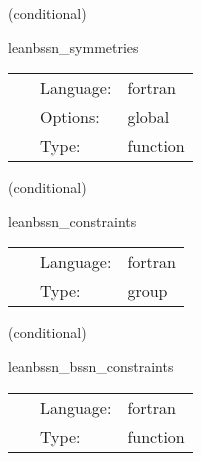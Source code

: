 \vspace{5mm}

   (conditional) 

\hspace{5mm} leanbssn\_symmetries 

\hspace{5mm}{\it register symmetries of the bssn grid functions } 


\hspace{5mm}

 \begin{tabular*}{160mm}{cll} 
~ & Language:  & fortran \\ 
~ & Options:  & global \\ 
~ & Type:  & function \\ 
\end{tabular*} 


\vspace{5mm}

   (conditional) 

\hspace{5mm} leanbssn\_constraints 

\hspace{5mm}{\it compute constraints } 


\hspace{5mm}

 \begin{tabular*}{160mm}{cll} 
~ & Language:  & fortran \\ 
~ & Type:  & group \\ 
\end{tabular*} 


\vspace{5mm}

   (conditional) 

\hspace{5mm} leanbssn\_bssn\_constraints 

\hspace{5mm}{\it compute constraints } 


\hspace{5mm}

 \begin{tabular*}{160mm}{cll} 
~ & Language:  & fortran \\ 
~ & Type:  & function \\ 
\end{tabular*} 


\vspace{5mm}

